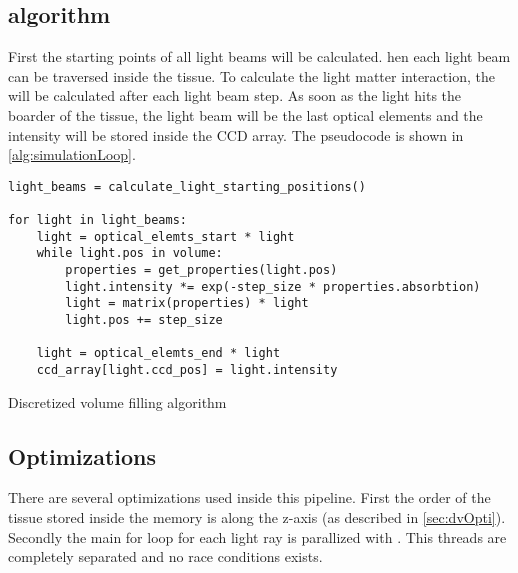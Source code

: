 \subsection{algorithm}
% 
First the starting points of all light beams will be calculated.
hen each light beam can be traversed inside the tissue.
To calculate the light matter interaction, the \dummy{} will be calculated after each light beam step.
As soon as the light hits the boarder of the tissue, the light beam will be the last optical elements and the intensity will be stored inside the \ac{CCD} array.
The pseudocode is shown in \cref{alg:simulationLoop}.
% 
\begin{lstfloat}[!tb]
\lstset{style=python}
\begin{lstlisting}[]
light_beams = calculate_light_starting_positions()

for light in light_beams:
    light = optical_elemts_start * light
    while light.pos in volume:
        properties = get_properties(light.pos)
        light.intensity *= exp(-step_size * properties.absorbtion)
        light = matrix(properties) * light
        light.pos += step_size
    
    light = optical_elemts_end * light
    ccd_array[light.ccd_pos] = light.intensity
\end{lstlisting}
\caption{Discretized volume filling algorithm}
\label{alg:simulationLoop}
\end{lstfloat}
% 
% 
% 
\subsection{Optimizations}
% 
There are several optimizations used inside this pipeline. 
First the order of the tissue stored inside the memory is along the z-axis (as described in \cref{sec:dvOpti}). 
Secondly the main for loop for each light ray is parallized with \openmp{}.
This threads are completely separated and no race conditions exists.
% 
% 
% 
